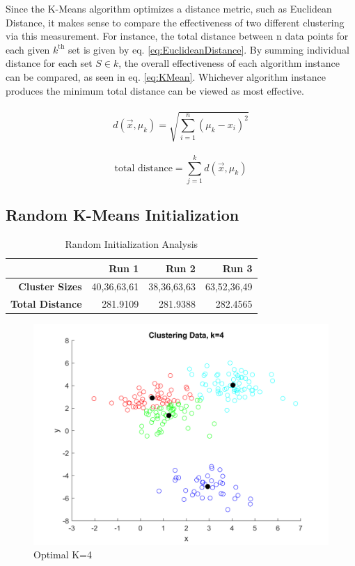\documentclass[12pt, letterpaper]{report}
\begin{document}
Since the K-Means algorithm optimizes a distance metric, such as Euclidean Distance, it makes sense to compare the effectiveness of two different clustering via this measurement. For instance, the total distance between n data points for each given $k^{\text{th}}$ set is given by eq. \ref{eq:EuclideanDistance}. By summing individual distance for each set $S \in k$, the overall effectiveness of each algorithm instance can be compared, as seen in eq. \ref{eq:KMean}. Whichever algorithm instance produces the minimum total distance can be viewed as most effective.
\\ \\
\begin{equation}
\label{eq:EuclideanDistance}
d(\vec{x},\mu_k) = \sqrt{\sum_{i=1}^{n} (\mu_k-x_i)^2}
\end{equation}
\\
\begin{equation}
\label{eq:KMean}
\text{total distance}  = \sum_{j=1}^{k} d(\vec{x},\mu_k)
\end{equation}

\subsection{Random K-Means Initialization}

\begin{table}[H]
	\centering
	\begin{tabular}{ |r|r|r|r| }
		\hline
		& \textbf{Run 1} & \textbf{Run 2} & \textbf{Run 3} \\
		\hline
		\textbf{Cluster Sizes} & 40,36,63,61 & 38,36,63,63 & 63,52,36,49 \\
		\hline
		\textbf{Total Distance} & 281.9109 & 281.9388 & 282.4565 \\
		\hline
	\end{tabular}
	\caption{Random Initialization Analysis}
\end{table}


\begin{figure}[H]
	\centering
	\includegraphics[width=0.7\columnwidth]{cluster_k4_opt.png}
	\caption{Optimal K=4}
\end{figure}
\end{document}
